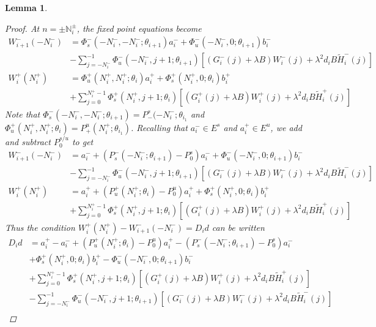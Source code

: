 \documentclass[12pt]{article}
\def\N{{\mathbb N}}
\newtheorem{lemma}{Lemma}
\begin{document}
\begin{lemma}
\begin{proof}
At $n = \pm \N_i^\pm$, the fixed point equations become
\begin{align*}
W_{i+1}^-(-N_i^-) &= 
\Phi_s^-(-N_i^-, -N_i^-; \theta_{i+1}) a_i^- + \Phi_u^-(-N_i^-, 0; \theta_{i+1}) b_i^- \\
&- \sum_{j = -N_i^-}^{-1} \Phi_u^-(-N_i^-, j+1; \theta_{i+1}) 
[(G_i^-(j) + \lambda B) W_i^-(j) + \lambda^2 d_i B \tilde{H}_i^-(j)] \\
W_i^+(N_i^+) &= \Phi_u^+(N_i^+, N_i^+; \theta_i) a_i^+ + \Phi_s^+(N_i^+, 0; \theta_i) b_i^+ \\
&+ \sum_{j = 0}^{N_i^+-1} \Phi_s^+(N_i^+, j+1; \theta_i) 
[(G_i^+(j) + \lambda B) W_i^+(j) + \lambda^2 d_i B \tilde{H}_i^+(j)]
\end{align*}
Note that $\Phi_s^-(-N_i^-, -N_i^-; \theta_{i+1}) = P_-^s(-N_i^-; \theta_{i_1}$ and $\Phi_u^+(N_i^+, N_i^+; \theta_i) = P_+^u(N_i^+; \theta_{i_1})$. Recalling that $a_i^- \in E^s$ and $a_i^+ \in E^u$, we add and subtract $P_0^{s/u}$ to get
\begin{align*}
W_{i+1}^-(-N_i^-) &= 
a_i^- + (P_s^-(-N_i^-; \theta_{i+1}) - P_0^s) a_i^- + \Phi_u^-(-N_i^-, 0; \theta_{i+1}) b_i^- \\
&- \sum_{j = -N_i^-}^{-1} \Phi_u^-(-N_i^-, j+1; \theta_{i+1}) 
[(G_i^-(j) + \lambda B) W_i^-(j) + \lambda^2 d_i B \tilde{H}_i^-(j)] \\
W_i^+(N_i^+) &= a_i^+ + (P_u^+(N_i^+; \theta_i) - P_0^u) a_i^+ + \Phi_s^+(N_i^+, 0; \theta_i) b_i^+ \\
&+ \sum_{j = 0}^{N_i^+-1} \Phi_s^+(N_i^+, j+1; \theta_i) 
[(G_i^+(j) + \lambda B) W_i^+(j) + \lambda^2 d_i B \tilde{H}_i^+(j)]
\end{align*}
Thus the condition $W_i^+(N_i^+) - W_{i+1}^-(-N_i^-) = D_i d$ can be written
\begin{align}
D_i d &= a_i^+ - a_i^- + (P_u^+(N_i^+; \theta_i) - P_0^u) a_i^+ - (P_s^-(-N_i^-; \theta_{i+1}) - P_0^s) a_i^- \\
&+ \Phi_s^+(N_i^+, 0; \theta_i) b_i^+ - \Phi_u^-(-N_i^-, 0; \theta_{i+1}) b_i^- \nonumber \\
&+ \sum_{j = 0}^{N_i^+-1} \Phi_s^+(N_i^+, j+1; \theta_i) 
[(G_i^+(j) + \lambda B) W_i^+(j) + \lambda^2 d_i B \tilde{H}_i^+(j)] \nonumber \\
&- \sum_{j = -N_i^-}^{-1} \Phi_u^-(-N_i^-, j+1; \theta_{i+1}) 
[(G_i^-(j) + \lambda B) W_i^-(j) + \lambda^2 d_i B \tilde{H}_i^-(j)] \nonumber \\
\end{align}


\end{proof}
\end{lemma}
\end{document}
